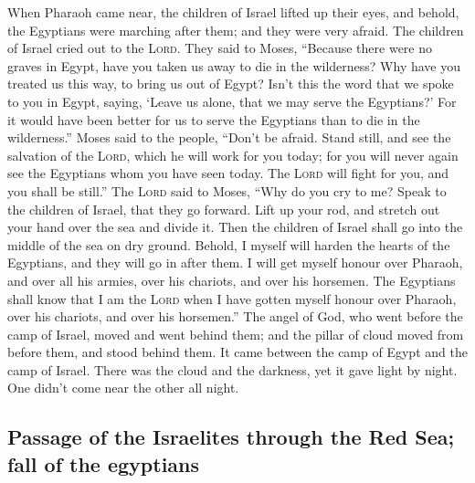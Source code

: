  When Pharaoh came near, the children of Israel lifted up
their eyes, and behold, the Egyptians were marching after them; and they
were very afraid. The children of Israel cried out to the \textsc{Lord}.
 They said to Moses, ``Because there were no graves in
Egypt, have you taken us away to die in the wilderness? Why have you
treated us this way, to bring us out of Egypt?  Isn't
this the word that we spoke to you in Egypt, saying, `Leave us alone,
that we may serve the Egyptians?' For it would have been better for us
to serve the Egyptians than to die in the wilderness.'' 
Moses said to the people, ``Don't be afraid. Stand still, and see the
salvation of the \textsc{Lord}, which he will work for you today; for
you will never again see the Egyptians whom you have seen today.
 The \textsc{Lord} will fight for you, and you shall be
still.''  The \textsc{Lord} said to Moses, ``Why do you
cry to me? Speak to the children of Israel, that they go forward.
 Lift up your rod, and stretch out your hand over the sea
and divide it. Then the children of Israel shall go into the middle of
the sea on dry ground.  Behold, I myself will harden the
hearts of the Egyptians, and they will go in after them. I will get
myself honour over Pharaoh, and over all his armies, over his chariots,
and over his horsemen.  The Egyptians shall know that I
am the \textsc{Lord} when I have gotten myself honour over Pharaoh, over
his chariots, and over his horsemen.''  The angel of God,
who went before the camp of Israel, moved and went behind them; and the
pillar of cloud moved from before them, and stood behind them.
 It came between the camp of Egypt and the camp of
Israel. There was the cloud and the darkness, yet it gave light by
night. One didn't come near the other all night.

\hypertarget{passage-of-the-israelites-through-the-red-sea-fall-of-the-egyptians}{%
\subsection{Passage of the Israelites through the Red Sea; fall of the
egyptians}\label{passage-of-the-israelites-through-the-red-sea-fall-of-the-egyptians}}

